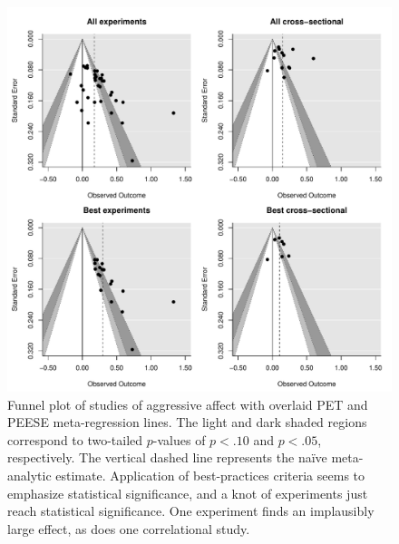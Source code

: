 \documentclass[man]{apa6}
\begin{document}
\begin{figure}
	\includegraphics[width = \textwidth, keepaspectratio]{funnels-0_AggAff.pdf}
	\caption{Funnel plot of studies of aggressive affect with overlaid PET and PEESE meta-regression lines. The light and dark shaded regions correspond to two-tailed $p$-values of $p < .10$ and $p < .05$, respectively. The vertical dashed line represents the na{\"i}ve meta-analytic estimate. Application of best-practices criteria seems to emphasize statistical significance, and a knot of experiments just reach statistical significance. One experiment \citep{Ballard:Wiest:1996} finds an implausibly large effect, as does one correlational study.}
	\label{funnel-aggaff}
\end{figure}
\end{document}

